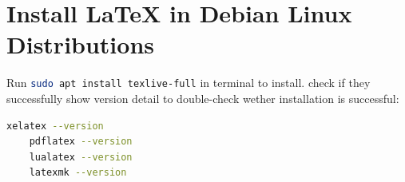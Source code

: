 \section{Install \LaTeX{} in Debian Linux Distributions}
\label{Installation_LaTeX_Debian}

Run \lstinline[language=bash]!sudo apt install texlive-full! in terminal to install. check if they successfully show version detail to double-check wether installation is successful:
\begin{lstlisting}[language=bash]
    xelatex --version
    pdflatex --version
    lualatex --version
    latexmk --version
\end{lstlisting}

